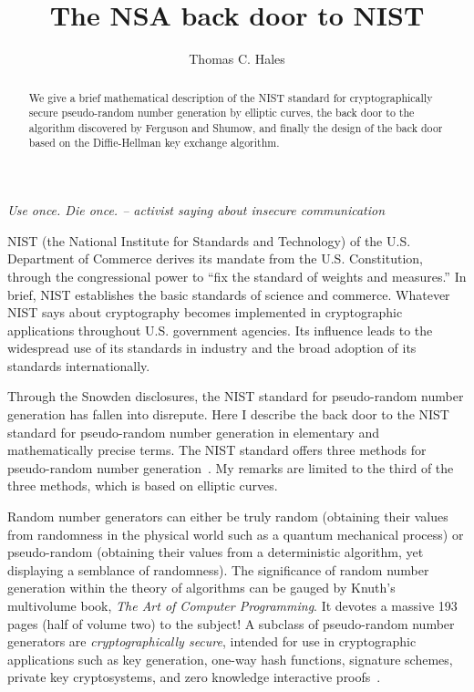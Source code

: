 \documentclass[11pt]{amsart} %
\begin{document}
\title{The NSA back door to NIST}
\author{Thomas C. Hales} 
\maketitle

\begin{abstract}  
We give a brief mathematical description of the NIST standard for cryptographically secure pseudo-random
number generation by elliptic curves, the back door to the algorithm discovered by Ferguson and Shumow, 
and finally the design of the back door based on the Diffie-Hellman key exchange algorithm.

\end{abstract}

\smallskip
\centerline{\it Use once. Die once. 
-- activist saying about insecure communication}
\smallskip

NIST (the National Institute for Standards and Technology) of the 
U.S. Department of Commerce derives its mandate from the U.S. Constitution,
through the congressional power  to ``fix the standard of weights and measures.''
In brief,  NIST establishes the basic standards of science and commerce.  
Whatever NIST says about cryptography becomes implemented in
cryptographic applications throughout U.S. government agencies.  Its influence
leads to the widespread use
of its standards in industry and the broad adoption of its standards internationally.

Through the Snowden disclosures, the NIST standard for pseudo-random number generation has fallen
 into disrepute.  Here I describe the back door to the NIST standard for pseudo-random number
generation in elementary and 
mathematically precise terms.  The NIST standard offers three methods
for pseudo-random number generation~\cite{NIST}.  
My remarks are limited to the third of the three methods, which is based on
elliptic curves.  

Random number generators can either be truly random (obtaining their values from randomness in the physical world such
as a quantum mechanical process) or pseudo-random (obtaining their values from a deterministic algorithm, yet displaying a semblance
of randomness). The significance of random number generation within the theory of algorithms can be gauged by Knuth's
multivolume book, {\it The Art of Computer Programming}. It devotes a massive 193 pages (half of volume two) to the subject!
A subclass of pseudo-random number generators are {\it cryptographically secure}, intended for use in cryptographic
applications such as key generation, one-way hash functions, signature schemes, private key cryptosystems, and zero knowledge interactive proofs~\cite{Luby1996}.
\end{document}
